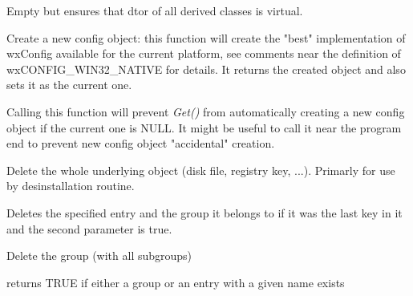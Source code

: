\label{wxconfigbasedtor}


Empty but ensures that dtor of all derived classes is virtual.

\label{wxconfigbasecreate}


Create a new config object: this function will create the "best"
implementation of wxConfig available for the current platform, see comments
near the definition of wxCONFIG\_WIN32\_NATIVE for details. It returns the
created object and also sets it as the current one.

\label{wxconfigbasedontcreateondemand}


Calling this function will prevent {\it Get()} from automatically creating a
new config object if the current one is NULL. It might be useful to call it
near the program end to prevent new config object "accidental" creation.

\label{wxconfigbasedeleteall}


Delete the whole underlying object (disk file, registry key, ...). Primarly
for use by desinstallation routine.

\label{wxconfigbasedeleteentry}


Deletes the specified entry and the group it belongs to if it was the last key
in it and the second parameter is true.

\label{wxconfigbasedeletegroup}


Delete the group (with all subgroups)

\label{wxconfigbaseexists}


returns TRUE if either a group or an entry with a given name exists

